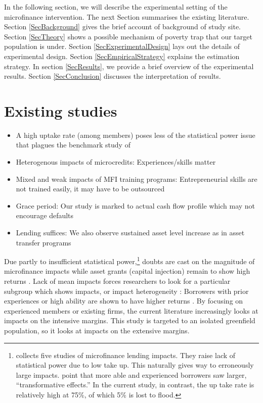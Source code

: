 	In the following section, we will describe the experimental setting of the microfinance intervention. The next Section summarises the existing literature. Section \ref{SecBackground} gives the brief account of background of study site. Section \ref{SecTheory} shows a possible mechanism of poverty trap that our target population is under. Section \ref{SecExperimentalDesign} lays out the details of experimental design. Section \ref{SecEmpiricalStrategy} explains the estimation strategy. In section \ref{SecResults}, we provide a brief overview of the experimental results. Section \ref{SecConclusion} discusses the interpretation of results.

\section{Existing studies}
\label{SecExistingStudies}

\begin{itemize}
\vspace{1.0ex}\setlength{\itemsep}{1.0ex}\setlength{\baselineskip}{12pt}
\item	A high uptake rate (among members) poses less of the statistical power issue that plagues the benchmark study of \citet{BanerjeeKarlanZinman2015}
\item	Heterogenous impacts of microcredits: Experiences/skills matter
\item	Mixed and weak impacts of MFI training programs: Entrepreneurial skills are not trained easily, it may have to be outsourced
\item	Grace period: Our study is marked to actual cash flow profile which may not encourage defaults
\item	Lending suffices: We also observe sustained asset level increase as in asset transfer programs
\end{itemize}

	Due partly to insufficient statistical power,\footnote{\citet{BanerjeeKarlanZinman2015} collects five studies of microfinance lending impacts. They raise lack of statistical power due to low take up. This naturally gives way to erroneously large impacts. \citet{BanerjeeKarlanZinman2015} point that more able and experienced borrowers saw larger, ``transformative effects.'' In the current study, in contrast, the up take rate is relatively high at 75\%, of which 5\% is lost to flood.  } doubts are cast on the magnitude of microfinance impacts \citep{BanerjeeKarlanZinman2015, DuvendackMader2019, Meager2019} while asset grants (capital injection) remain to show high returns \citep{deMel2008, DeMel2014, FafchampsFlypaper2014, BandieraBRAC2017}. Lack of mean impacts forces researchers to look for a particular subgroup which shows impacts, or impact heterogeneity \citep{Banerjee2017HyderabadFollowup}: Borrowers with prior experiences or high ability are shown to have higher returns \citep{Banerjee2015Miracle, Mckenzie2017Spurring, Buera2017}. By focusing on experienced members or existing firms, the current literature increasingly looks at impacts on the intensive margins. This study is targeted to an isolated greenfield population, so it looks at impacts on the extensive margins.

